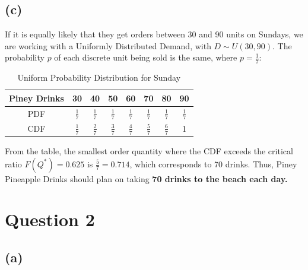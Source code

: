 \documentclass[12pt]{article}
\begin{document}
\subsection*{(c)}   


If it is equally likely that they get orders between 30 and 90 units on Sundays, we are working with a Uniformly Distributed Demand, with $D \sim U(30,90)$. The probability $p$ of each discrete unit being sold is the same, where $p = \frac{1}{7}$: \begin{table}[H]
    \centering
    \def\arraystretch{1.5}
    \begin{tabular}{|c|c|c|c|c|c|c|c|} \hline 
        Piney Drinks & 30 & 40 & 50 & 60 & \textbf{70} & 80 & 90 \\ \hline 
        PDF & $\frac{1}{7}$ & $\frac{1}{7}$ & $\frac{1}{7}$ & $\frac{1}{7}$ & $\frac{1}{7}$ & $\frac{1}{7}$ & $\frac{1}{7}$ \\ \hline \hline 
        CDF & $\frac{1}{7}$ & $\frac{2}{7}$ & $\frac{3}{7}$ & $\frac{4}{7}$ & $\frac{5}{7}$ & $\frac{6}{7}$ & 1 \\ \hline 
    \end{tabular}
    \caption{Uniform Probability Distribution for Sunday}
    \label{tab:2-cumprobuniform}
\end{table} 

\noindent From the table, the smallest order quantity where the CDF exceeds the critical ratio $F(Q^{*}) = 0.625$ is $\frac{5}{7} = 0.714$, which corresponds to 70 drinks. Thus, Piney Pineapple Drinks should plan on taking \textbf{70 drinks to the beach each day.}

\newpage 

\section*{Question 2}



\subsection*{(a)}   
\end{document}
